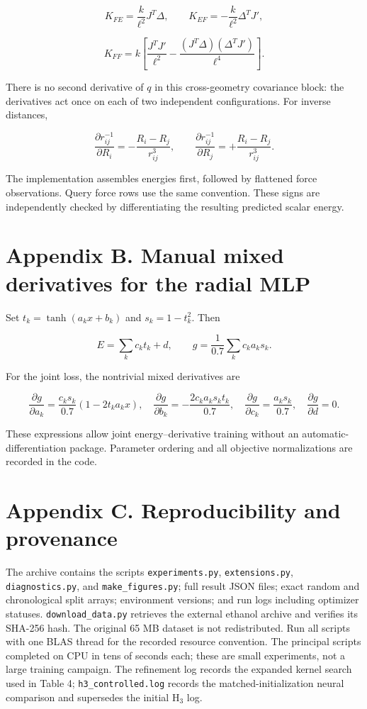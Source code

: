 \documentclass[
  11pt,
  a4paper,
]{article}
\begin{document}
\[K_{FE}=\frac{k}{\ell^2}J^T\Delta,\qquad K_{EF}=-\frac{k}{\ell^2}\Delta^T J',\]

\[K_{FF}=k\left[\frac{J^T J'}{\ell^2}-\frac{(J^T\Delta)(\Delta^T J')}{\ell^4}\right].\]

There is no second derivative of \(q\) in this cross-geometry covariance
block: the derivatives act once on each of two independent
configurations. For inverse distances,

\[\frac{\partial r_{ij}^{-1}}{\partial R_i}=-\frac{R_i-R_j}{r_{ij}^3},\qquad \frac{\partial r_{ij}^{-1}}{\partial R_j}=+\frac{R_i-R_j}{r_{ij}^3}.\]

The implementation assembles energies first, followed by flattened force
observations. Query force rows use the same convention. These signs are
independently checked by differentiating the resulting predicted scalar
energy.

\hypertarget{appendix-b.-manual-mixed-derivatives-for-the-radial-mlp}{%
\section{Appendix B. Manual mixed derivatives for the radial
MLP}\label{appendix-b.-manual-mixed-derivatives-for-the-radial-mlp}}

Set \(t_k=\tanh(a_kx+b_k)\) and \(s_k=1-t_k^2\). Then

\[E=\sum_k c_kt_k+d,\qquad g=\frac{1}{0.7}\sum_k c_ka_ks_k.\]

For the joint loss, the nontrivial mixed derivatives are

\[\frac{\partial g}{\partial a_k}=\frac{c_ks_k}{0.7}(1-2t_ka_kx),\quad
\frac{\partial g}{\partial b_k}=-\frac{2c_ka_ks_kt_k}{0.7},\quad
\frac{\partial g}{\partial c_k}=\frac{a_ks_k}{0.7},\quad
\frac{\partial g}{\partial d}=0.\]

These expressions allow joint energy--derivative training without an
automatic-differentiation package. Parameter ordering and all objective
normalizations are recorded in the code.

\hypertarget{appendix-c.-reproducibility-and-provenance}{%
\section{Appendix C. Reproducibility and
provenance}\label{appendix-c.-reproducibility-and-provenance}}

The archive contains the scripts \texttt{experiments.py},
\texttt{extensions.py}, \texttt{diagnostics.py}, and
\texttt{make\_figures.py}; full result JSON files; exact random and
chronological split arrays; environment versions; and run logs including
optimizer statuses. \texttt{download\_data.py} retrieves the external
ethanol archive and verifies its SHA-256 hash. The original 65 MB
dataset is not redistributed. Run all scripts with one BLAS thread for
the recorded resource convention. The principal scripts completed on CPU
in tens of seconds each; these are small experiments, not a large
training campaign. The refinement log records the expanded kernel search
used in Table 4; \texttt{h3\_controlled.log} records the
matched-initialization neural comparison and supersedes the initial
H\(_3\) log.
\end{document}
